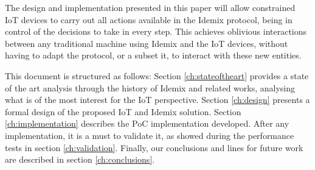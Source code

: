 


The design and implementation presented in this paper will allow constrained IoT devices to carry out all actions available in the Idemix protocol, being in control of the decisions to take in every step. This achieves oblivious interactions between any traditional machine using Idemix and the IoT devices, without having to adapt the protocol, or a subset it, to interact with these new entities.


\hfil


This document is structured as follows: Section \ref{ch:stateoftheart} provides a state of the art analysis through the history of Idemix and related works, analysing what is of the most interest for the IoT perspective. Section \ref{ch:design} presents a formal design of the proposed IoT and Idemix solution. Section \ref{ch:implementation} describes the PoC implementation developed. After any implementation, it is a must to validate it, as showed during the performance tests in section \ref{ch:validation}. Finally, our conclusions and lines for future work are described in section \ref{ch:conclusions}.